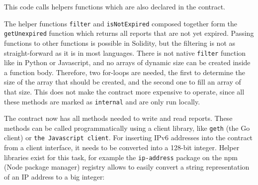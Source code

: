 

This code calls helpers functions which are also declared in the contract.



The helper functions \texttt{filter} and \texttt{isNotExpired} composed together form the \texttt{getUnexpired} function which returns all reports that are not yet expired. Passing functions to other functions is possible in Solidity, but the filtering is not as straight-forward as it is in most languages. There is not native \texttt{filter} function like in Python or Javascript, and no arrays of dynamic size can be created inside a function body. Therefore, two for-loops are needed, the first to determine the size of the array that should be created, and the second one to fill an array of that size. This does not make the contract more expensive to operate, since all these methods are marked as \texttt{internal} and are only run locally.

The contract now has all methods needed to write and read reports. These methods can be called programmatically using a client library, like \texttt{geth} (the Go client) or \texttt{the Javascript client}. For inserting IPv6 addresses into the contract from a client interface, it needs to be converted into a 128-bit integer. Helper libraries exist for this task, for example the \texttt{ip-address} package on the npm (Node package manager) registry allows to easily convert a string representation of an IP address to a big integer:


